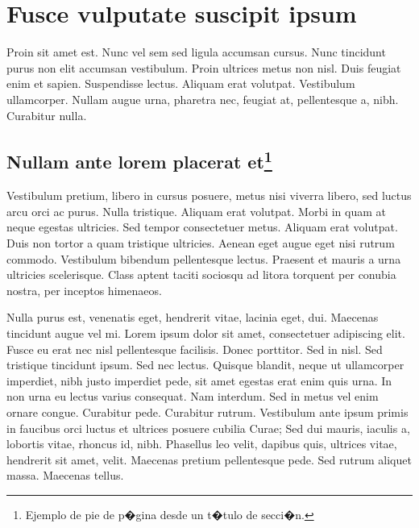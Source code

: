 %
%
\chapter[Fusce vulputate suscipit ipsum]{
	Fusce vulputate suscipit ipsum
	\label{nombre_referencia_al_capitulo_020}
}

Proin sit amet est. Nunc vel sem sed ligula accumsan cursus. Nunc tincidunt purus non elit accumsan vestibulum. Proin ultrices metus non nisl. Duis feugiat enim et sapien. Suspendisse lectus. Aliquam erat volutpat. Vestibulum ullamcorper. Nullam augue urna, pharetra nec, feugiat at, pellentesque a, nibh. Curabitur nulla.


%
%
\section[Nullam ante lorem placerat et]{
	Nullam ante lorem placerat et\footnote{Ejemplo de pie de p�gina desde un t�tulo de secci�n.}
}


Vestibulum pretium, libero in cursus posuere, metus nisi viverra libero, sed luctus arcu orci ac purus. Nulla tristique. Aliquam erat volutpat. Morbi in quam at neque egestas ultricies. Sed tempor consectetuer metus. Aliquam erat volutpat. Duis non tortor a quam tristique ultricies. Aenean eget augue eget nisi rutrum commodo. Vestibulum bibendum pellentesque lectus. Praesent et mauris a urna ultricies scelerisque. Class aptent taciti sociosqu ad litora torquent per conubia nostra, per inceptos himenaeos.

Nulla purus est, venenatis eget, hendrerit vitae, lacinia eget, dui. Maecenas tincidunt augue vel mi. Lorem ipsum dolor sit amet, consectetuer adipiscing elit. Fusce eu erat nec nisl pellentesque facilisis. Donec porttitor. Sed in nisl. Sed tristique tincidunt ipsum. Sed nec lectus. Quisque blandit, neque ut ullamcorper imperdiet, nibh justo imperdiet pede, sit amet egestas erat enim quis urna. In non urna eu lectus varius consequat. Nam interdum. Sed in metus vel enim ornare congue. Curabitur pede. Curabitur rutrum. Vestibulum ante ipsum primis in faucibus orci luctus et ultrices posuere cubilia Curae; Sed dui mauris, iaculis a, lobortis vitae, rhoncus id, nibh. Phasellus leo velit, dapibus quis, ultrices vitae, hendrerit sit amet, velit. Maecenas pretium pellentesque pede. Sed rutrum aliquet massa. Maecenas tellus.

